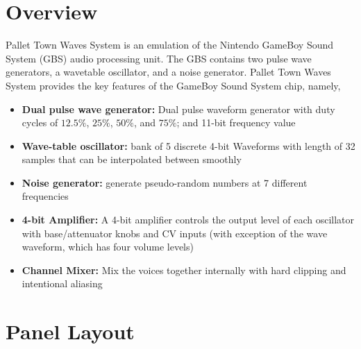 \documentclass[12pt,letter]{article}
\begin{document}


\section{Overview}

Pallet Town Waves System is an emulation of the Nintendo GameBoy Sound System (GBS) audio processing unit. The GBS contains two pulse wave generators, a wavetable oscillator, and a noise generator. Pallet Town Waves System provides the key features of the GameBoy Sound System chip, namely,
\begin{itemize}
  \item \textbf{Dual pulse wave generator:} Dual pulse waveform generator with duty cycles of $12.5\%$, $25\%$, $50\%$, and $75\%$; and 11-bit frequency value
  \item \textbf{Wave-table oscillator:} bank of 5 discrete 4-bit Waveforms with length of 32 samples that can be interpolated between smoothly
  \item \textbf{Noise generator:} generate pseudo-random numbers at 7 different frequencies
  \item \textbf{4-bit Amplifier:} A 4-bit amplifier controls the output level of each oscillator with base/attenuator knobs and CV inputs (with exception of the wave waveform, which has four volume levels)
  \item \textbf{Channel Mixer:} Mix the voices together internally with hard clipping and intentional aliasing
\end{itemize}


\clearpage
\section{Panel Layout}
\end{document}
